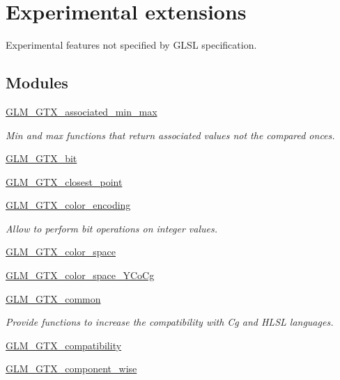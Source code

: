 \hypertarget{group__gtx}{}\section{Experimental extensions}
\label{group__gtx}


Experimental features not specified by G\+L\+SL specification.  


\subsection*{Modules}
\begin{DoxyCompactItemize}
\item 
\mbox{\hyperlink{group__gtx__associated__min__max}{G\+L\+M\+\_\+\+G\+T\+X\+\_\+associated\+\_\+min\+\_\+max}}
\begin{DoxyCompactList}\small\item\em Min and max functions that return associated values not the compared onces. \end{DoxyCompactList}\item 
\mbox{\hyperlink{group__gtx__bit}{G\+L\+M\+\_\+\+G\+T\+X\+\_\+bit}}
\item 
\mbox{\hyperlink{group__gtx__closest__point}{G\+L\+M\+\_\+\+G\+T\+X\+\_\+closest\+\_\+point}}
\item 
\mbox{\hyperlink{group__gtx__color__encoding}{G\+L\+M\+\_\+\+G\+T\+X\+\_\+color\+\_\+encoding}}
\begin{DoxyCompactList}\small\item\em Allow to perform bit operations on integer values. \end{DoxyCompactList}\item 
\mbox{\hyperlink{group__gtx__color__space}{G\+L\+M\+\_\+\+G\+T\+X\+\_\+color\+\_\+space}}
\item 
\mbox{\hyperlink{group__gtx__color__space___y_co_cg}{G\+L\+M\+\_\+\+G\+T\+X\+\_\+color\+\_\+space\+\_\+\+Y\+Co\+Cg}}
\item 
\mbox{\hyperlink{group__gtx__common}{G\+L\+M\+\_\+\+G\+T\+X\+\_\+common}}
\begin{DoxyCompactList}\small\item\em Provide functions to increase the compatibility with Cg and H\+L\+SL languages. \end{DoxyCompactList}\item 
\mbox{\hyperlink{group__gtx__compatibility}{G\+L\+M\+\_\+\+G\+T\+X\+\_\+compatibility}}
\item 
\mbox{\hyperlink{group__gtx__component__wise}{G\+L\+M\+\_\+\+G\+T\+X\+\_\+component\+\_\+wise}}

\end{DoxyCompactItemize}
